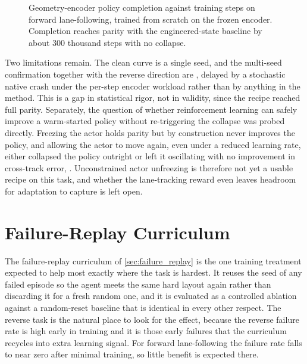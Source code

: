 \begin{figure}[H]
    \centering
    \caption{Geometry-encoder policy completion against training steps on forward lane-following, trained from scratch on the frozen encoder. Completion reaches parity with the engineered-state baseline by about 300 thousand steps with no collapse.}
    \label{fig:geometry_rl_curve}
\end{figure}

Two limitations remain. The clean curve is a single seed, and the multi-seed confirmation together with the reverse direction are , delayed by a stochastic native crash under the per-step encoder workload rather than by anything in the method. This is a gap in statistical rigor, not in validity, since the recipe reached full parity. Separately, the question of whether reinforcement learning can safely improve a warm-started policy without re-triggering the collapse was probed directly. Freezing the actor holds parity but by construction never improves the policy, and allowing the actor to move again, even under a reduced learning rate, either collapsed the policy outright or left it oscillating with no improvement in cross-track error, . Unconstrained actor unfreezing is therefore not yet a usable recipe on this task, and whether the lane-tracking reward even leaves headroom for adaptation to capture is left open.

\section{Failure-Replay Curriculum}
\label{sec:failure_replay_results}

The failure-replay curriculum of \cref{sec:failure_replay} is the one training treatment expected to help most exactly where the task is hardest. It reuses the seed of any failed episode so the agent meets the same hard layout again rather than discarding it for a fresh random one, and it is evaluated as a controlled ablation against a random-reset baseline that is identical in every other respect. The reverse task is the natural place to look for the effect, because the reverse failure rate is high early in training and it is those early failures that the curriculum recycles into extra learning signal. For forward lane-following the failure rate falls to near zero after minimal training, so little benefit is expected there.

